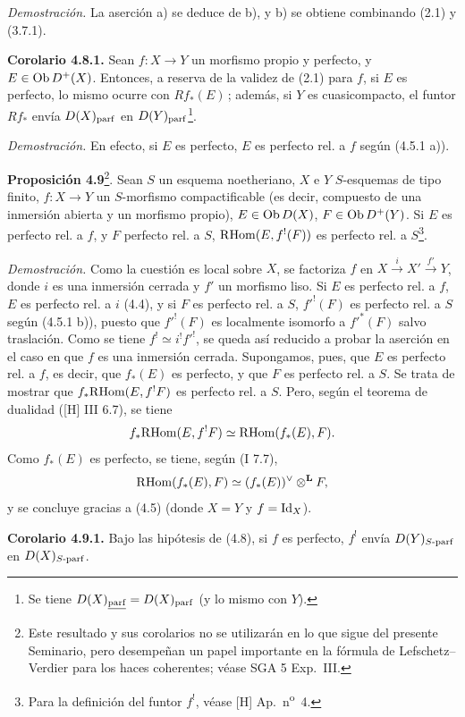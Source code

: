 \emph{Demostración.} La aserción a) se deduce de b), y b) se obtiene combinando (2.1) y (3.7.1).

\textbf{Corolario 4.8.1.} Sean \(f:X\to Y\) un morfismo propio y perfecto, y \(E\in\operatorname{Ob} D^+(X)\). Entonces, a reserva de la validez de (2.1) para \(f\), si \(E\) es perfecto, lo mismo ocurre con \(Rf_*(E)\)\,; además, si \(Y\) es cuasicompacto, el funtor \(Rf_*\) envía \(D(X)_{\mathrm{parf}}\) en \(D(Y)_{\mathrm{parf}}\)\footnote{Se tiene \(D(X)_{\uparf}=D(X)_{\parf}\) (y lo mismo con \(Y\)).}.

\emph{Demostración.} En efecto, si \(E\) es perfecto, \(E\) es perfecto rel. a \(f\) según (4.5.1 a)).

\textbf{Proposición 4.9}\footnote{Este resultado y sus corolarios no se utilizarán en lo que sigue del presente Seminario, pero desempeñan un papel importante en la fórmula de Lefschetz--Verdier para los haces coherentes; véase SGA 5 Exp.\ III.}. Sean \(S\) un esquema noetheriano, \(X\) e \(Y\) \(S\)-esquemas de tipo finito, \(f:X\to Y\) un \(S\)-morfismo compactificable (es decir, compuesto de una inmersión abierta y un morfismo propio), \(E\in\operatorname{Ob} D(X)\), \(F\in\operatorname{Ob} D^+(Y)\). Si \(E\) es perfecto rel. a \(f\), y \(F\) perfecto rel. a \(S\), \(\mathrm R\!\operatorname{Hom}(E,f^!(F))\) es perfecto rel. a \(S\)\footnote{Para la definición del funtor \(f^!\), véase [H] Ap.\ n\textsuperscript{o}~4.}.

\emph{Demostración.} Como la cuestión es local sobre \(X\), se factoriza \(f\) en \(X\xrightarrow{i}X'\xrightarrow{f'}Y\), donde \(i\) es una inmersión cerrada y \(f'\) un morfismo liso. Si \(E\) es perfecto rel. a \(f\), \(E\) es perfecto rel. a \(i\) (4.4), y si \(F\) es perfecto rel. a \(S\), \(f'^!(F)\) es perfecto rel. a \(S\) según (4.5.1 b)), puesto que \(f'^!(F)\) es localmente isomorfo a \(f'^*(F)\) salvo traslación. Como se tiene \(f^!\simeq i^!f'^!\), se queda así reducido a probar la aserción en el caso en que \(f\) es una inmersión cerrada. Supongamos, pues, que \(E\) es perfecto rel. a \(f\), es decir, que \(f_*(E)\) es perfecto, y que \(F\) es perfecto rel. a \(S\). Se trata de mostrar que \(f_*\mathrm R\!\operatorname{Hom}(E,f^!F)\) es perfecto rel. a \(S\). Pero, según el teorema de dualidad ([H] III 6.7), se tiene
\[
 f_*\mathrm R\!\operatorname{Hom}(E,f^!F)\simeq\mathrm R\!\operatorname{Hom}(f_*(E),F).
\]
Como \(f_*(E)\) es perfecto, se tiene, según (I 7.7),
\[
 \mathrm R\!\operatorname{Hom}(f_*(E),F)\simeq(f_*(E))^{\vee}\otimes^{\mathbf L}F,
\]
y se concluye gracias a (4.5) (donde \(X=Y\) y \(f=\operatorname{Id}_X\)).

\textbf{Corolario 4.9.1.} Bajo las hipótesis de (4.8), si \(f\) es perfecto, \(f^!\) envía \(D(Y)_{S\text{-}\mathrm{parf}}\) en \(D(X)_{S\text{-}\mathrm{parf}}\).

